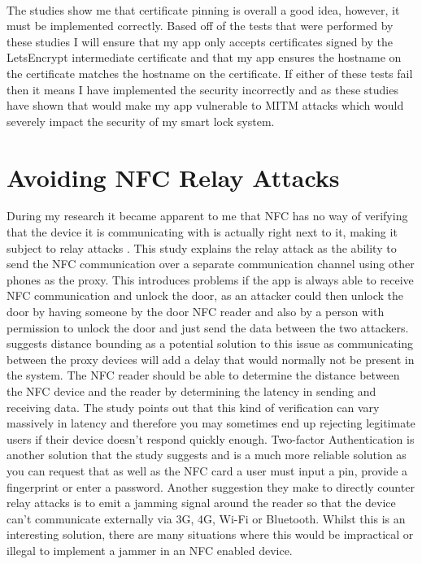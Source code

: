 \\
\indent The studies show me that certificate pinning is overall a good idea, however, it must be implemented correctly. Based off of the tests that were performed by these studies I will ensure that my app only accepts certificates signed by the LetsEncrypt intermediate certificate and that my app ensures the hostname on the certificate matches the hostname on the certificate. If either of these tests fail then it means I have implemented the security incorrectly and as these studies have shown that would make my app vulnerable to MITM attacks which would severely impact the security of my smart lock system.

\section{Avoiding NFC Relay Attacks}
During my research it became apparent to me that NFC has no way of verifying that the device it is communicating with is actually right next to it, making it subject to relay attacks \citep{Francis2010}. This study explains the relay attack as the ability to send the NFC communication over a separate communication channel using other phones as the proxy. This introduces problems if the app is always able to receive NFC communication and unlock the door, as an attacker could then unlock the door by having someone by the door NFC reader and also by a person with permission to unlock the door and just send the data between the two attackers. \cite{Oh2015} suggests distance bounding as a potential solution to this issue as communicating between the proxy devices will add a delay that would normally not be present in the system. The NFC reader should be able to determine the distance between the NFC device and the reader by determining the latency in sending and receiving data. The study points out that this kind of verification can vary massively in latency and therefore you may sometimes end up rejecting legitimate users if their device doesn't respond quickly enough. Two-factor Authentication is another solution that the study suggests and is a much more reliable solution as you can request that as well as the NFC card a user must input a pin, provide a fingerprint or enter a password. Another suggestion they make to directly counter relay attacks is to emit a jamming signal around the reader so that the device can't communicate externally via 3G, 4G, Wi-Fi or Bluetooth. Whilst this is an interesting solution, there are many situations where this would be impractical or illegal to implement a jammer in an NFC enabled device.
